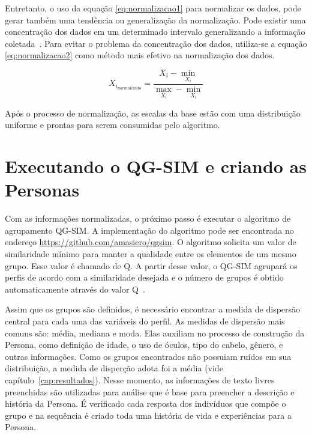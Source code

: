 Entretanto, o uso da equação \ref{eq:normalizacao1} para normalizar os dados, pode gerar também uma tendência ou generalização da normalização. Pode existir uma concentração dos dados em um determinado intervalo generalizando a informação coletada~\cite{masiero:2013}. Para evitar o problema da concentração dos dados, utiliza-se a equação \ref{eq:normalizacao2} como método mais efetivo na normalização dos dados.

\begin{equation}
	X_{i_{normalizado}} = \frac{X_i - \min_{X_i}}{\max_{X_i} - \min_{X_i}}
	\label{eq:normalizacao2}
\end{equation}

Após o processo de normalização, as escalas da base estão com uma distribuição uniforme e prontas para serem consumidas pelo algoritmo.

\section{Executando o QG-SIM e criando as Personas}
\label{sec:criarpersonas}
Com as informações normalizadas, o próximo passo é executar o algoritmo de agrupamento QG-SIM. A implementação do algoritmo pode ser encontrada no endereço \url{https://github.com/amasiero/qgsim}. O algoritmo solicita um valor de similaridade mínimo para manter a qualidade entre os elementos de um mesmo grupo. Esse valor é chamado de Q. A partir desse valor, o QG-SIM agrupará os perfis de acordo com a similaridade desejada e o número de grupos é obtido automaticamente através do valor Q~\cite{masiero:2013}.

Assim que os grupos são definidos, é necessário encontrar a medida de dispersão central para cada uma das variáveis do perfil. As medidas de dispersão mais comuns são: média, mediana e moda. Elas auxiliam no processo de construção da Persona, como definição de idade, o uso de óculos, tipo do cabelo, gênero, e outras informações. Como os grupos encontrados não possuiam ruídos em sua distribuição, a medida de disperção adota foi a média (vide capítulo~\ref{cap:resultados}). Nesse momento, as informações de texto livres preenchidas são utilizadas para análise que é base para preencher a descrição e história da Persona. É verificado cada resposta dos indivíduos que compõe o grupo e na sequência é criado toda uma história de vida e experiências para a Persona.

